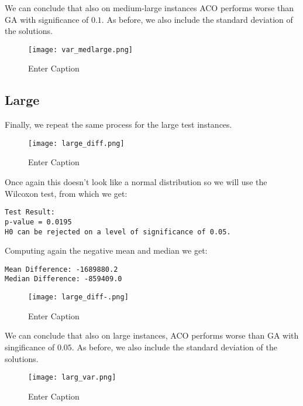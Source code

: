 \documentclass{article}
\begin{document}
We can conclude that also on medium-large instances ACO performs worse than GA with significance of $0.1$.
As before, we also include the standard deviation of the solutions.

\begin{figure}[H]
    \centering
    \texttt{[image: var\_medlarge.png]}
    \caption{Enter Caption}
    \label{fig:enter-label}
\end{figure}

\subsection{Large}

Finally, we repeat the same process for the large test instances.
\begin{figure}[H]
    \centering
    \texttt{[image: large\_diff.png]}
    \caption{Enter Caption}
    \label{fig:enter-label}
\end{figure}
Once again this doesn't look like a normal distribution so we will use the Wilcoxon test, from which we get:
\begin{verbatim}
Test Result: 
p-value = 0.0195 
H0 can be rejected on a level of significance of 0.05.  
\end{verbatim}
Computing again the negative mean and median we get:
\begin{verbatim}
Mean Difference: -1689880.2 
Median Difference: -859409.0 
\end{verbatim}
\begin{figure}[H]
    \centering
    \texttt{[image: large\_diff-.png]}
    \caption{Enter Caption}
    \label{fig:enter-label}
\end{figure}

We can conclude that also on large instances, ACO performs worse than GA with singificance of $0.05$.
As before, we also include the standard deviation of the solutions.

\begin{figure}[H]
    \centering
    \texttt{[image: larg\_var.png]}
    \caption{Enter Caption}
    \label{fig:enter-label}
\end{figure}
\end{document}
